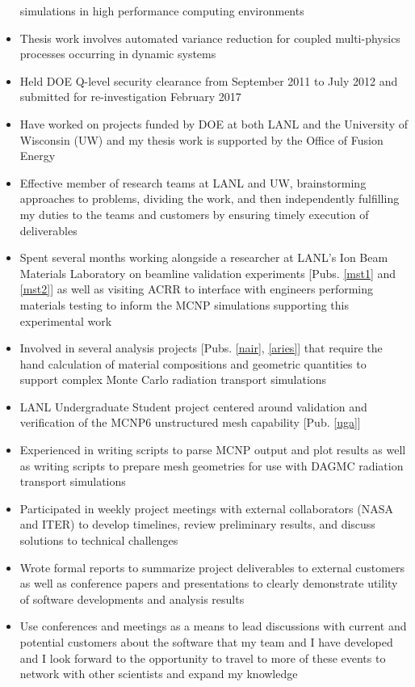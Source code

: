 \documentclass[a4paper,10pt]{article}
\begin{document}
\begin{itemize}[leftmargin=.9in,rightmargin=.875in,itemsep=1.6mm]
		       simulations
		       in high performance computing environments
	       \item Thesis work involves automated variance reduction for
		       coupled multi-physics processes occurring in dynamic
		       systems
              \item Held DOE Q-level security clearance from September 2011 to July
		      2012 and submitted for re-investigation February 2017
		\item  Have worked on projects funded by DOE at both LANL and
			the University of Wisconsin (UW) and my thesis work is supported by the Office of Fusion Energy
		\item Effective member of research teams at LANL and
			UW, brainstorming approaches to problems, dividing the
			work, and then independently fulfilling my duties to the teams and
			customers by ensuring timely execution of deliverables
		\item Spent several months working alongside a researcher
			at LANL's Ion Beam Materials Laboratory
			on beamline validation experiments 
		        [Pubs. \ref{mst1} and \ref{mst2}]
                        as well as
			visiting ACRR to interface with engineers performing
			materials testing to inform the MCNP simulations
			supporting this experimental work
	       \item Involved in several analysis projects
		      [Pubs. \ref{nair}, \ref{aries}]	       
			       that require the hand calculation of material compositions
			     and geometric quantities to support complex Monte
			      Carlo radiation transport simulations
	       \item  LANL Undergraduate Student project centered around validation and
		       verification of the MCNP6 unstructured mesh
		       capability [Pub. \ref{uga}]
	       \item Experienced in writing scripts to parse MCNP output
	               and plot results as well as writing scripts to
		       prepare mesh geometries for use with DAGMC
		       radiation transport simulations
                \item Participated in weekly project meetings with external collaborators (NASA and
	              ITER) to develop timelines, review preliminary results, and discuss
		      solutions to technical challenges
		\item Wrote formal reports to summarize project
			deliverables to external customers as well as conference
			papers and presentations to clearly demonstrate
			utility of software
			developments and analysis results
	       \item Use conferences and meetings as a means to lead
		       discussions with current and potential customers about
		       the software that my team and I have developed and I look forward to the opportunity to travel to
		       more of these events to network with other
			scientists and expand my knowledge
		       


\end{itemize} 
\end{document}
